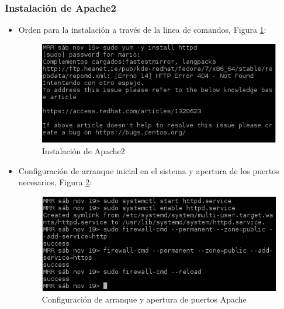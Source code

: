 	
\subsubsection{Instalación de Apache2}
	\begin{itemize}
		\item Orden para la instalación a través de la linea de comandos, Figura \ref{fig:figura30}:
		\begin{figure}[H] %
			\centering
			\includegraphics[scale=0.6]{figuras/figura30.png} 
			\caption{Instalación de Apache2} 
			\label{fig:figura30}
		\end{figure}
	
		\item Configuración de arranque inicial en el sistema y apertura de los puertos necesarios, Figura \ref{fig:figura31}:
		\begin{figure}[H] %
			\centering
			\includegraphics[scale=0.6]{figuras/figura31.png} 
			\caption{Configuración de arranque y apertura de puertos Apache} 
			\label{fig:figura31}
		\end{figure}
	

\end{itemize}
